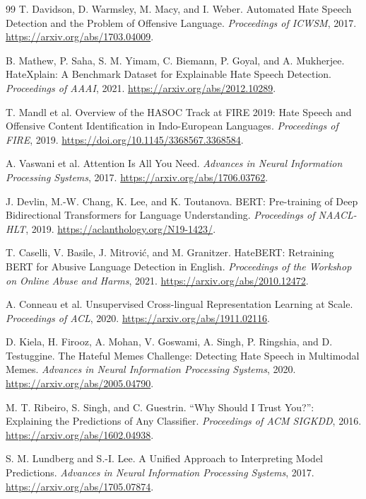 \documentclass[11pt,a4paper]{article}
\begin{document}
\clearpage
\begin{thebibliography}{99}
\small
{}
T. Davidson, D. Warmsley, M. Macy, and I. Weber.
Automated Hate Speech Detection and the Problem of Offensive Language.
\emph{Proceedings of ICWSM}, 2017.
\url{https://arxiv.org/abs/1703.04009}.

B. Mathew, P. Saha, S. M. Yimam, C. Biemann, P. Goyal, and A. Mukherjee.
HateXplain: A Benchmark Dataset for Explainable Hate Speech Detection.
\emph{Proceedings of AAAI}, 2021.
\url{https://arxiv.org/abs/2012.10289}.

T. Mandl et al.
Overview of the HASOC Track at FIRE 2019: Hate Speech and Offensive Content
Identification in Indo-European Languages.
\emph{Proceedings of FIRE}, 2019.
\url{https://doi.org/10.1145/3368567.3368584}.

A. Vaswani et al. Attention Is All You Need.
\emph{Advances in Neural Information Processing Systems}, 2017.
\url{https://arxiv.org/abs/1706.03762}.

J. Devlin, M.-W. Chang, K. Lee, and K. Toutanova.
BERT: Pre-training of Deep Bidirectional Transformers for Language Understanding.
\emph{Proceedings of NAACL-HLT}, 2019.
\url{https://aclanthology.org/N19-1423/}.

T. Caselli, V. Basile, J. Mitrovi\'{c}, and M. Granitzer.
HateBERT: Retraining BERT for Abusive Language Detection in English.
\emph{Proceedings of the Workshop on Online Abuse and Harms}, 2021.
\url{https://arxiv.org/abs/2010.12472}.

A. Conneau et al.
Unsupervised Cross-lingual Representation Learning at Scale.
\emph{Proceedings of ACL}, 2020.
\url{https://arxiv.org/abs/1911.02116}.

D. Kiela, H. Firooz, A. Mohan, V. Goswami, A. Singh, P. Ringshia, and D. Testuggine.
The Hateful Memes Challenge: Detecting Hate Speech in Multimodal Memes.
\emph{Advances in Neural Information Processing Systems}, 2020.
\url{https://arxiv.org/abs/2005.04790}.

M. T. Ribeiro, S. Singh, and C. Guestrin.
``Why Should I Trust You?'': Explaining the Predictions of Any Classifier.
\emph{Proceedings of ACM SIGKDD}, 2016.
\url{https://arxiv.org/abs/1602.04938}.

S. M. Lundberg and S.-I. Lee.
A Unified Approach to Interpreting Model Predictions.
\emph{Advances in Neural Information Processing Systems}, 2017.
\url{https://arxiv.org/abs/1705.07874}.


\end{thebibliography}
\end{document}

